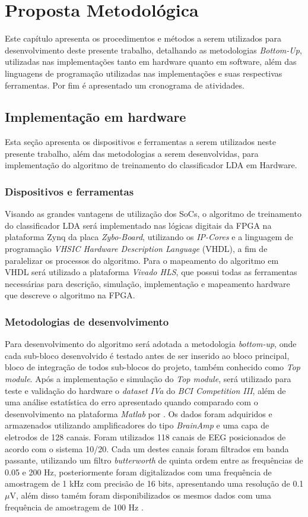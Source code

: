 \chapter[Proposta Metodológica]{Proposta Metodológica}
Este capítulo apresenta os procedimentos e métodos a serem utilizados para desenvolvimento deste presente trabalho, detalhando as metodologias \textit{Bottom-Up}, utilizadas nas implementações tanto em hardware quanto em software, além das linguagens de programação utilizadas nas implementações e suas respectivas ferramentas. Por fim é apresentado um cronograma de atividades.

\section{Implementação em hardware}
Esta seção apresenta os dispositivos e ferramentas a serem utilizados neste presente trabalho, além das metodologias a serem desenvolvidas, para implementação do algoritmo de treinamento do classificador LDA em Hardware.

\subsection{Dispositivos e ferramentas}
Visando as grandes vantagens de utilização dos SoCs, o algoritmo de treinamento do classificador LDA será implementado nas lógicas digitais da FPGA na plataforma Zynq da placa \textit{Zybo-Board}, utilizando os \textit{IP-Cores} e a linguagem de programação \textit{VHSIC Hardware Description Language} (VHDL), a fim de paralelizar os processos do algoritmo. Para o mapeamento do algoritmo em VHDL será utilizado a plataforma \textit{Vivado HLS}, que possui todas as ferramentas necessárias para descrição, simulação, implementação e mapeamento hardware que descreve o algoritmo na FPGA.

\subsection{Metodologias de desenvolvimento}
Para desenvolvimento do algoritmo será adotada a metodologia \textit{bottom-up}, onde cada sub-bloco desenvolvido é testado antes de ser inserido ao bloco principal, bloco de integração de todos sub-blocos do projeto, também conhecido como \textit{Top module}.
Após a implementação e simulação do \textit{Top module}, será utilizado para teste e validação do hardware
 o \textit{dataset IVa} do \textit{BCI Competition III}, além de uma análise estatística do erro apresentado
 quando comparado com o desenvolvimento na plataforma \textit{Matlab} por \cite{F.Lotte}.
Os dados foram adquiridos e armazenados utilizando amplificadores do tipo \textit{BrainAmp} e
 uma capa de eletrodos de 128 canais. Foram utilizados 118 canais de EEG posicionados de acordo
 com o sistema 10/20. Cada um destes canais foram filtrados em banda passante, utilizando um
 filtro \textit{butterworth} de quinta ordem entre as frequências de 0.05 e 200 Hz,
 posteriormente foram digitalizados com uma frequência de amostragem de 1 kHz com
 precisão de 16 bits, apresentando uma resolução de 0.1 $\mu$V, além disso tamém
 foram disponibilizados os mesmos dados com uma frequência de amostragem de 100 Hz \cite{siteBCI}.

